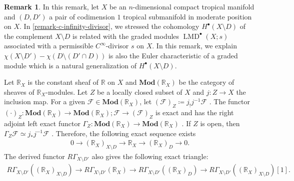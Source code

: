 \documentclass[a4paper,dvipdfmx,reqno,12pt]{amsart}
\theoremstyle{definition}
\newtheorem{remark}[theorem]{Remark}
\newcommand{\deq}{\coloneqq}
\newcommand{\opn}[1]{\operatorname{#1}}
\newcommand{\catn}[1]{\mathbf{#1}}
\numberwithin{equation}{section}
\begin{document}
\begin{remark}
In this remark,
let $X$ be an $n$-dimensional compact tropical manifold
and $(D,D')$ a pair of
codimension $1$ tropical submanifold in moderate position
on $X$.
In \cref{remark-c-infinity-divisor},
we stressed
the cohomology $H^{\bullet}(X\setminus D)$ of
the complement $X\setminus D$ is related with
the graded modules $\opn{LMD}^{\bullet}(X;s)$
associated with a permissible
$C^{\infty}$-divisor $s$ on $X$.
In this remark, we explain
$\chi(X\setminus D')-\chi(D\setminus (D'\cap D))$
is also the Euler characteristic of a graded module
which is a natural generalization of 
$H^{\bullet}(X\setminus D)$.

Let $\mathbb{R}_X$ is the constant sheaf of $\mathbb{R}$
on $X$ and 
$\catn{Mod}(\mathbb{R}_X)$ be the category of sheaves of 
$\mathbb{R}_X$-modules.
Let $Z$ be a locally closed subset of $X$ and
$j\colon Z\to X$ the inclusion map.
For a given $\mathcal{F}\in \catn{Mod}(\mathbb{R}_X)$,
let $(\mathcal{F})_{Z}\deq j_!j^{-1}\mathcal{F}$ 
\cite[Proposition 2.3.6]{MR1299726}.
The functor
$(\cdot)_{Z}\colon \catn{Mod}(\mathbb{R}_X) \to
\catn{Mod}(\mathbb{R}_X);
\mathcal{F}\to (\mathcal{F})_Z$ is exact and has
the right adjoint left exact functor 
$\Gamma_{Z}\colon \catn{Mod}(\mathbb{R}_X) \to
\catn{Mod}(\mathbb{R}_X)$
\cite[Definition 2.3.8]{MR1299726}.
If $Z$ is open, then
$\Gamma_{Z}\mathcal{F}\simeq
j_*j^{-1}\mathcal{F}$
\cite[Proposition 2.3.9 (iii)]{MR1299726}.
Therefore, the following exact sequence exists
\begin{align}
\label{equation-closed-open-exact}
0 \to (\mathbb{R}_X)_{X\setminus D}
\to \mathbb{R}_X \to (\mathbb{R}_X)_{D} \to 0.
\end{align}
The derived functor $R\Gamma_{X\setminus D'}$ also gives
the following exact triangle:
\begin{align}
R\Gamma_{X\setminus D'}((\mathbb{R}_X)_{X\setminus D})
\to  R\Gamma_{X\setminus D'}(\mathbb{R}_X)
\to R\Gamma_{X\setminus D'}((\mathbb{R}_X)_D)
\to R\Gamma_{X\setminus D'}((\mathbb{R}_X)_{X\setminus D})[1].
\end{align}



\end{remark}
\end{document}
